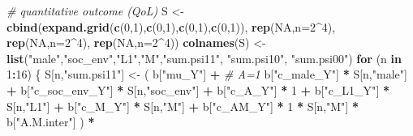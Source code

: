 \documentclass[
]{book}
\newenvironment{Shaded}{\begin{snugshade}}{\end{snugshade}}
\newcommand{\AttributeTok}[1]{\textcolor[rgb]{0.13,0.29,0.53}{#1}}
\newcommand{\CommentTok}[1]{\textcolor[rgb]{0.56,0.35,0.01}{\textit{#1}}}
\newcommand{\ConstantTok}[1]{\textcolor[rgb]{0.56,0.35,0.01}{#1}}
\newcommand{\ControlFlowTok}[1]{\textcolor[rgb]{0.13,0.29,0.53}{\textbf{#1}}}
\newcommand{\DecValTok}[1]{\textcolor[rgb]{0.00,0.00,0.81}{#1}}
\newcommand{\FunctionTok}[1]{\textcolor[rgb]{0.13,0.29,0.53}{\textbf{#1}}}
\newcommand{\NormalTok}[1]{#1}
\newcommand{\OtherTok}[1]{\textcolor[rgb]{0.56,0.35,0.01}{#1}}
\newcommand{\SpecialCharTok}[1]{\textcolor[rgb]{0.81,0.36,0.00}{\textbf{#1}}}
\newcommand{\StringTok}[1]{\textcolor[rgb]{0.31,0.60,0.02}{#1}}
\begin{document}
\begin{Shaded}
\begin{Highlighting}[]
  \CommentTok{\# quantitative outcome (QoL)}
\NormalTok{  S }\OtherTok{\textless{}{-}} \FunctionTok{cbind}\NormalTok{(}\FunctionTok{expand.grid}\NormalTok{(}\FunctionTok{c}\NormalTok{(}\DecValTok{0}\NormalTok{,}\DecValTok{1}\NormalTok{),}\FunctionTok{c}\NormalTok{(}\DecValTok{0}\NormalTok{,}\DecValTok{1}\NormalTok{),}\FunctionTok{c}\NormalTok{(}\DecValTok{0}\NormalTok{,}\DecValTok{1}\NormalTok{),}\FunctionTok{c}\NormalTok{(}\DecValTok{0}\NormalTok{,}\DecValTok{1}\NormalTok{)), }\FunctionTok{rep}\NormalTok{(}\ConstantTok{NA}\NormalTok{,}\AttributeTok{n=}\DecValTok{2}\SpecialCharTok{\^{}}\DecValTok{4}\NormalTok{), }
             \FunctionTok{rep}\NormalTok{(}\ConstantTok{NA}\NormalTok{,}\AttributeTok{n=}\DecValTok{2}\SpecialCharTok{\^{}}\DecValTok{4}\NormalTok{), }\FunctionTok{rep}\NormalTok{(}\ConstantTok{NA}\NormalTok{,}\AttributeTok{n=}\DecValTok{2}\SpecialCharTok{\^{}}\DecValTok{4}\NormalTok{))}
  \FunctionTok{colnames}\NormalTok{(S) }\OtherTok{\textless{}{-}} \FunctionTok{list}\NormalTok{(}\StringTok{"male"}\NormalTok{,}\StringTok{"soc\_env"}\NormalTok{,}\StringTok{"L1"}\NormalTok{,}\StringTok{"M"}\NormalTok{,}\StringTok{"sum.psi11"}\NormalTok{, }\StringTok{"sum.psi10"}\NormalTok{, }
                      \StringTok{"sum.psi00"}\NormalTok{)}
  \ControlFlowTok{for}\NormalTok{ (n }\ControlFlowTok{in} \DecValTok{1}\SpecialCharTok{:}\DecValTok{16}\NormalTok{) \{}
\NormalTok{    S[n,}\StringTok{"sum.psi11"}\NormalTok{] }\OtherTok{\textless{}{-}}\NormalTok{  ( b[}\StringTok{"mu\_Y"}\NormalTok{] }\SpecialCharTok{+}                                          \CommentTok{\# A=1}
\NormalTok{                             b[}\StringTok{"c\_male\_Y"}\NormalTok{] }\SpecialCharTok{*}\NormalTok{ S[n,}\StringTok{"male"}\NormalTok{] }\SpecialCharTok{+} 
\NormalTok{                             b[}\StringTok{"c\_soc\_env\_Y"}\NormalTok{] }\SpecialCharTok{*}\NormalTok{ S[n,}\StringTok{"soc\_env"}\NormalTok{] }\SpecialCharTok{+} 
\NormalTok{                             b[}\StringTok{"c\_A\_Y"}\NormalTok{] }\SpecialCharTok{*} \DecValTok{1} \SpecialCharTok{+} 
\NormalTok{                             b[}\StringTok{"c\_L1\_Y"}\NormalTok{] }\SpecialCharTok{*}\NormalTok{ S[n,}\StringTok{"L1"}\NormalTok{] }\SpecialCharTok{+}
\NormalTok{                             b[}\StringTok{"c\_M\_Y"}\NormalTok{] }\SpecialCharTok{*}\NormalTok{ S[n,}\StringTok{"M"}\NormalTok{] }\SpecialCharTok{+}
\NormalTok{                             b[}\StringTok{"c\_AM\_Y"}\NormalTok{] }\SpecialCharTok{*} \DecValTok{1} \SpecialCharTok{*}\NormalTok{ S[n,}\StringTok{"M"}\NormalTok{] }\SpecialCharTok{*}\NormalTok{ b[}\StringTok{"A.M.inter"}\NormalTok{] ) }\SpecialCharTok{*}

\end{Highlighting}
\end{Shaded}
\end{document}
